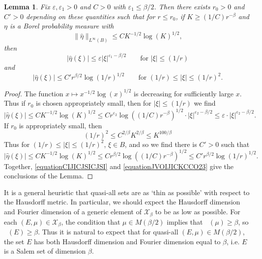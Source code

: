 \documentclass[12pt,reqno]{article}
\numberwithin{equation}{section}
\DeclareMathOperator{\fordim}{\dim_{\mathbf{F}}}
\newtheorem{lemma}[theorem]{Lemma}
\numberwithin{theorem}{section}
\begin{document}
\begin{lemma} \label{remarkGGIVJIS}
    Fix $\varepsilon,\varepsilon_1 > 0$ and $C > 0$ with $\varepsilon_1 \leq \beta/2$. Then there exists $r_0 > 0$ and $C' > 0$ depending on these quantities such that for $r \leq r_0$, if $K \geq (1/C) r^{-\beta}$ and $\eta$ is a Borel probability measure with
    \begin{equation}
        \| \widehat{\eta} \|_{L^\infty(B)} \leq C K^{-1/2} \log(K)^{1/2},
    \end{equation}
    then
    \[ |\widehat{\eta}(\xi)| \leq \varepsilon |\xi|^{\varepsilon_1 - \beta/2} \quad\quad \text{for $|\xi| \leq (1/r)$} \]
    and
    \[ |\widehat{\eta}(\xi)| \leq C' r^{\beta/2} \log(1/r)^{1/2} \quad\quad \text{for $(1/r) \leq |\xi| \leq (1/r)^{2}$}. \]
\end{lemma}
\begin{proof}
    The function $x \mapsto x^{-1/2} \log(x)^{1/2}$ is decreasing for sufficiently large $x$. Thus if $r_0$ is chosen appropriately small, then for $|\xi| \leq (1/r)$ we find
    \begin{equation} \label{equationCIJICJSICJSI}
        |\widehat{\eta}(\xi)| \leq C K^{-1/2} \log(K)^{1/2} \leq C r^{\varepsilon_2} \log((1/C) r^{-\beta})^{1/2} \cdot |\xi|^{\varepsilon_2 - \beta/2} \leq \varepsilon \cdot |\xi|^{\varepsilon_2 - \beta/2}.
    \end{equation}
    If $r_0$ is appropriately small, then
    \begin{equation}
        (1/r)^2 \leq C^{2/\beta} K^{2/\beta} \leq K^{100/\beta}
    \end{equation}
    Thus for $(1/r) \leq |\xi| \leq (1/r)^2$, $\xi \in B$, and so we find there is $C' > 0$ such that
    \begin{equation} \label{equationJVOIJICKCCO23}
        |\widehat{\eta}(\xi)| \leq C K^{-1/2} \log(K)^{1/2} \leq C r^{\beta/2} \log((1/C) r^{-\beta})^{1/2} \leq C' r^{\beta/2} \log(1/r)^{1/2}.
    \end{equation}
    Together, \eqref{equationCIJICJSICJSI} and \eqref{equationJVOIJICKCCO23} give the conclusions of the Lemma.
\end{proof}

It is a general heuristic that quasi-all sets are as `thin as possible' with respect to the Hausdorff metric. In particular, we should expect the Hausdorff dimension and Fourier dimension of a generic element of $\mathcal{X}_\beta$ to be as low as possible. For each $(E,\mu) \in \mathcal{X}_\beta$, the condition that $\mu \in M(\beta/2)$ implies that $\fordim(\mu) \geq \beta$, so $\fordim(E) \geq \beta$. Thus it is natural to expect that for quasi-all $(E,\mu) \in M(\beta/2)$, the set $E$ has both Hausdorff dimension and Fourier dimension equal to $\beta$, i.e. $E$ is a Salem set of dimension $\beta$.
\end{document}
